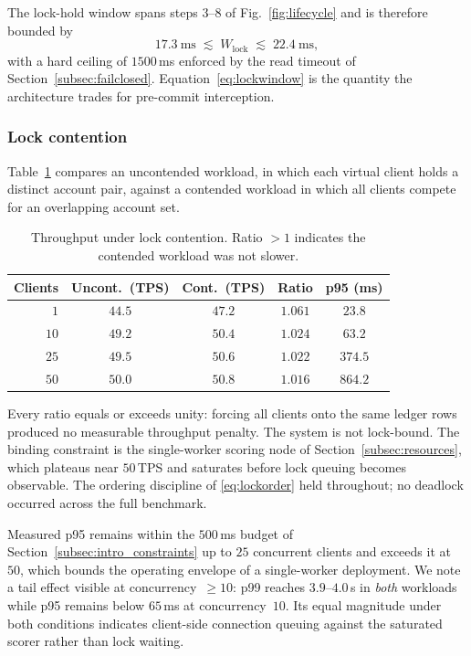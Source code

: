 \documentclass[conference]{IEEEtran}
\begin{document}
The lock-hold window spans steps 3--8 of Fig.~\ref{fig:lifecycle} and
is therefore bounded by
\begin{equation}
17.3~\mathrm{ms} \;\lesssim\; W_{\mathrm{lock}} \;\lesssim\; 22.4~\mathrm{ms},
\label{eq:lockwindow}
\end{equation}
with a hard ceiling of $1500$\,ms enforced by the read timeout of
Section~\ref{subsec:failclosed}. Equation~\eqref{eq:lockwindow} is the
quantity the architecture trades for pre-commit interception.

\subsubsection{Lock contention}
Table~\ref{tab:contention} compares an uncontended workload, in which
each virtual client holds a distinct account pair, against a contended
workload in which all clients compete for an overlapping account set.

\begin{table}[t]
\centering
\caption{Throughput under lock contention. Ratio $>1$ indicates the
contended workload was not slower.}
\label{tab:contention}
\renewcommand{\arraystretch}{1.2}
\footnotesize
\begin{tabular}{@{}rcccc@{}}
\toprule
\textbf{Clients} & \textbf{Uncont.\ (TPS)} & \textbf{Cont.\ (TPS)} & \textbf{Ratio} & \textbf{p95 (ms)} \\
\midrule
$1$  & $44.5$ & $47.2$ & $1.061$ & $23.8$  \\
$10$ & $49.2$ & $50.4$ & $1.024$ & $63.2$  \\
$25$ & $49.5$ & $50.6$ & $1.022$ & $374.5$ \\
$50$ & $50.0$ & $50.8$ & $1.016$ & $864.2$ \\
\bottomrule
\end{tabular}
\end{table}

Every ratio equals or exceeds unity: forcing all clients onto the same
ledger rows produced no measurable throughput penalty. The system is
not lock-bound. The binding constraint is the single-worker scoring
node of Section~\ref{subsec:resources}, which plateaus near $50$\,TPS
and saturates before lock queuing becomes observable. The ordering
discipline of \eqref{eq:lockorder} held throughout; no deadlock
occurred across the full benchmark.

Measured p95 remains within the $500$\,ms budget of
Section~\ref{subsec:intro_constraints} up to $25$ concurrent clients
and exceeds it at $50$, which bounds the operating envelope of a
single-worker deployment. We note a tail effect visible at
concurrency~$\geq 10$: p99 reaches $3.9$--$4.0$\,s in \emph{both}
workloads while p95 remains below $65$\,ms at concurrency~$10$. Its
equal magnitude under both conditions indicates client-side connection
queuing against the saturated scorer rather than lock waiting.
\end{document}
